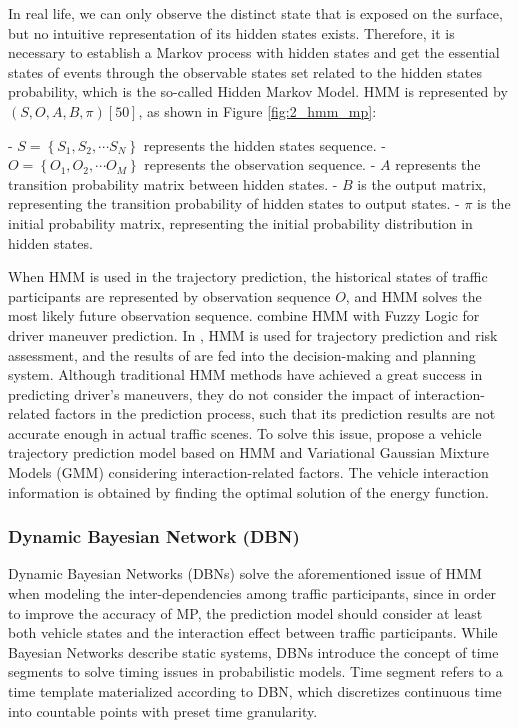 In real life, we can only observe the distinct state that is exposed on the surface, but no intuitive representation of its hidden states exists. Therefore, it is necessary to establish a Markov process with hidden states and get the essential states of events through the observable states set related to the hidden states probability, which is the so-called Hidden Markov Model. HMM is represented by $(S, O, A, B, \pi)[50]$, as shown in Figure \ref{fig:2_hmm_mp}:

- $S=\left\{S_1, S_2, \cdots S_N\right\}$ represents the hidden states sequence.
- $O=\left\{O_1, O_2, \cdots O_M\right\}$ represents the observation sequence.
- $A$ represents the transition probability matrix between hidden states.
- $B$ is the output matrix, representing the transition probability of hidden states to output states.
- $\pi$ is the initial probability matrix, representing the initial probability distribution in hidden states.

When HMM is used in the trajectory prediction, the historical states of traffic participants are represented by observation sequence $O$, and HMM solves the most likely future observation sequence. \cite{deng2018improved} combine HMM with Fuzzy Logic for driver maneuver prediction. In \cite{wang2021decision}, HMM is used for trajectory prediction and risk assessment, and the results of are fed into the decision-making and planning system. Although traditional HMM methods have achieved a great success in predicting driver’s maneuvers, they do not consider the impact of interaction-related factors in the prediction process, such that its prediction results are not accurate enough in actual traffic scenes. To solve this issue, \cite{deo2018would} propose a vehicle trajectory prediction model based on HMM and Variational Gaussian Mixture Models (GMM) considering interaction-related factors. The vehicle interaction information is obtained by finding the optimal solution of the energy function.

\subsubsection{Dynamic Bayesian Network (DBN)}
\label{subsubsec:2_dbn_mp}

Dynamic Bayesian Networks (DBNs) \cite{koller2009probabilistic} solve the aforementioned issue of HMM when modeling the inter-dependencies among traffic participants, since in order to improve the accuracy of \ac{MP}, the prediction model should consider at least both vehicle states and the interaction effect between traffic participants. While Bayesian Networks describe static systems, DBNs introduce the concept of time segments to solve timing issues in probabilistic models. Time segment refers to a time template materialized according to DBN, which discretizes continuous time into countable points with preset time granularity. \\

